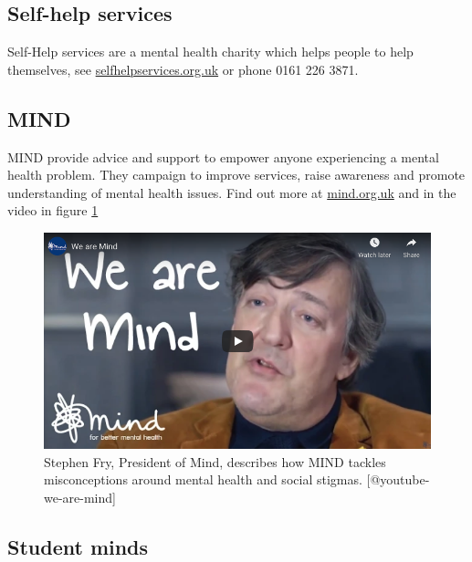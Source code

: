 \documentclass[
]{book}
\begin{document}
\hypertarget{selfhelp}{%
\subsection{Self-help services}\label{selfhelp}}

Self-Help services are a mental health charity which helps people to help themselves, see \href{https://www.selfhelpservices.org.uk/}{selfhelpservices.org.uk} or phone 0161 226 3871.

\hypertarget{mindhelp}{%
\subsection{MIND}\label{mindhelp}}

MIND provide advice and support to empower anyone experiencing a mental health problem. They campaign to improve services, raise awareness and promote understanding of mental health issues. Find out more at \href{https://www.mind.org.uk}{mind.org.uk} and in the video in figure \ref{fig:stephenfry-fig}

\begin{figure}

{\centering \includegraphics[width=0.99\linewidth]{images/youtube-we-are-mind} 

}

\caption{Stephen Fry, President of Mind, describes how MIND tackles misconceptions around mental health and social stigmas. [@youtube-we-are-mind] }\label{fig:stephenfry-fig}
\end{figure}

\hypertarget{studentminds}{%
\subsection{Student minds}\label{studentminds}}
\end{document}
